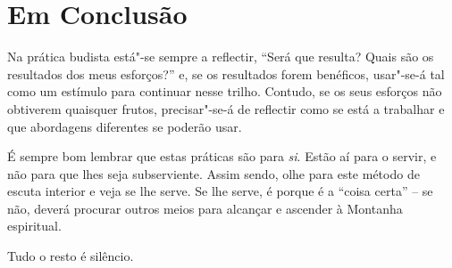 \chapter{Em Conclusão}

Na prática budista está"-se sempre a reflectir, ``Será que resulta? Quais
são os resultados dos meus esforços?'' e, se os resultados forem
benéficos, usar"-se-á tal como um estímulo para continuar nesse trilho.
Contudo, se os seus esforços não obtiverem quaisquer frutos,
precisar"-se-á de reflectir como se está a trabalhar e que abordagens
diferentes se poderão usar.

É sempre bom lembrar que estas práticas são para \emph{si}. Estão aí
para o servir, e não para que lhes seja subserviente. Assim sendo, olhe
para este método de escuta interior e veja se lhe serve. Se lhe serve, é
porque é a ``coisa certa'' -- se não, deverá procurar outros meios para
alcançar e ascender à Montanha espiritual.

Tudo o resto é silêncio.
